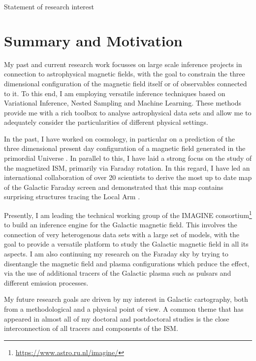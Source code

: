 \begin{center}
\Huge{Statement of research interest}
\end{center}

\section{Summary and Motivation}

My past and current research work focusses on large scale inference projects in connection to astrophysical magnetic fields, with the goal to constrain the three dimensional configuration of the magnetic field itself or of observables connected to it.
To this end, I am employing versatile inference techniques based on Variational Inference, Nested Sampling and Machine Learning.
These methods provide me with a rich toolbox to analyse astrophysical data sets and allow me to adequately consider the particularities of different physical settings. \par
In the past, I have worked on cosmology, in particular on a prediction of the three dimensional present day configuration of a magnetic field generated in the primordial Universe \citep{2018Hutschenreuter}.
In parallel to this, I have laid a strong focus on the study of the magnetized ISM, primarily via Faraday rotation.
In this regard, I have led an international collaboration of over 20 scientists to derive the most up to date map of the Galactic Faraday screen \citep{2022Hutschenreuter} and demonstrated that this map contains surprising structures tracing the Local Arm \citep{2019Hutschenreuter}. \par
Presently, I am leading the technical working group of the IMAGINE consortium\footnote{\href{https://www.astro.ru.nl/imagine/}{https://www.astro.ru.nl/imagine/}} to build an inference engine for the Galactic magnetic field.
This involves the connection of very heterogenous data sets with a large set of models, with the goal to provide a versatile platform to study the Galactic magnetic field in all its aspects.
I am also continuing my research on the Faraday sky by trying to disentangle the magnetic field and plasma configurations which prduce the effect, via the use of additional tracers of the Galactic plasma such as pulsars and different emission processes.
\par
My future research goals are driven by my interest in Galactic cartography, both from a methodological and a physical point of view.
A common theme that has appeared in almost all of my doctoral and postdoctoral studies is the close interconnection of all tracers and components of the ISM.
